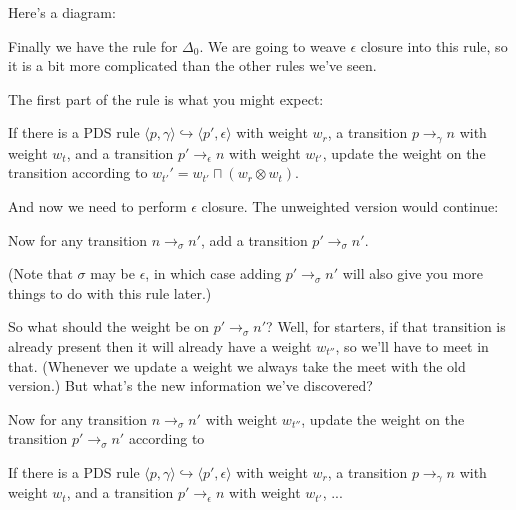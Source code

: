\documentclass{article}
\newcommand{\Config}[2]{\ensuremath{\langle #1, #2 \rangle}}
\newcommand{\Rule}[2]{\ensuremath{#1 \hookrightarrow #2}}
\newcommand{\Trans}[3]{\ensuremath{#1 \rightarrow_{#2} #3}}
\newcommand{\meet}{\sqcap}
\newcommand{\extend}{\otimes}
\begin{document}
Here's a diagram:


Finally we have the rule for $\Delta_0$. We are going to weave
$\epsilon$ closure into this rule, so it is a bit more complicated
than the other rules we've seen.

The first part of the rule is what you might expect:

   If there is a PDS rule
   \Rule{\Config{p}{\gamma}}{\Config{p'}{\epsilon}} with weight $w_r$,
   a transition \Trans{p}{\gamma}{n} with weight $w_t$, and a
   transition \Trans{p'}{\epsilon}{n} with weight $w_{t'}$, update the
   weight on the transition according to $w_{t'}' = w_{t'} \meet (w_r
   \extend w_t)$.

And now we need to perform $\epsilon$ closure. The unweighted version
would continue:

   Now for any transition \Trans{n}{\sigma}{n'}, add a transition
   \Trans{p'}{\sigma}{n'}.

(Note that $\sigma$ may be $\epsilon$, in which case adding
\Trans{p'}{\sigma}{n'} will also give you more things to do with
this rule later.)

So what should the weight be on \Trans{p'}{\sigma}{n'}? Well, for
starters, if that transition is already present then it will already
have a weight $w_{t''}$, so we'll have to meet in that. (Whenever we
update a weight we always take the meet with the old version.) But
what's the new information we've discovered?

   Now for any transition \Trans{n}{\sigma}{n'} with weight $w_{t''}$,
   update the weight on the transition \Trans{p'}{\sigma}{n'}
   according to 





   If there is a PDS rule
   \Rule{\Config{p}{\gamma}}{\Config{p'}{\epsilon}} with weight $w_r$,
   a transition \Trans{p}{\gamma}{n} with weight $w_t$, and a
   transition \Trans{p'}{\epsilon}{n} with weight $w_{t'}$, ...
\end{document}
